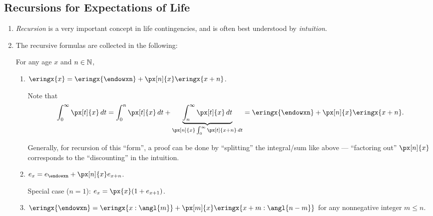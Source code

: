 \subsection{Recursions for Expectations of Life}
\begin{enumerate}
\item \emph{Recursion} is a very important concept in life contingencies, and
is often best understood by \emph{intuition}.
\item The recursive formulas are collected in the following:
\begin{proposition}
\label{prp:elife-recursion}
For any age \(x\) and \(n\in\mathbb{N}\),
\begin{enumerate}
\item \(\eringx{x}=\eringx{\endowxn}+\px[n]{x}\eringx{x+n}\).

\begin{intuition}

\end{intuition}

\begin{pf}
Note that
\[
\int_{0}^{\infty}\px[t]{x}\,dt
=\int_{0}^{n}\px[t]{x}\,dt
+\underbrace{\int_{n}^{\infty}\px[t]{x}\,dt}_{\px[n]{x}\int_{0}^{\infty}\px[t]{x+n}\,dt}
=\eringx{\endowxn}+\px[n]{x}\eringx{x+n}.
\]
\end{pf}

\begin{note}
Generally, for recursion of this ``form'', a proof can be done by ``splitting''
the integral/sum like above --- ``factoring out'' \(\px[n]{x}\) corresponds to the
``discounting'' in the intuition.
\end{note}
\item \(e_x=e_{\endowxn}+\px[n]{x}e_{x+n}\).
\begin{note}
Special case (\(n=1\)): \(e_x=\px{x}(1+e_{x+1})\).
\end{note}
\item \(\eringx{\endowxn}=\eringx{x:\angl{m}}+\px[m]{x}\eringx{x+m:\angl{n-m}}\) for any nonnegative integer \(m\le n\).


\end{enumerate}
\end{proposition}
\end{enumerate}
